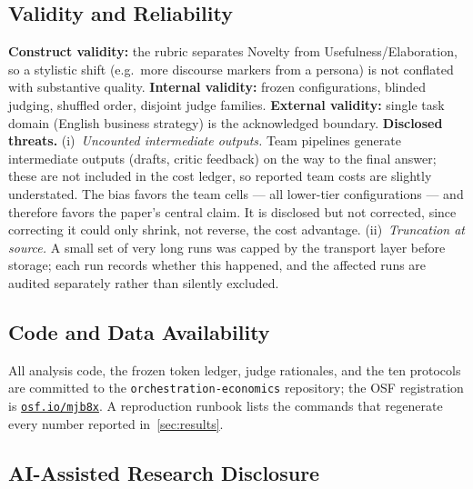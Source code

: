 \documentclass[12pt,a4paper]{article}
\begin{document}
\subsection{Validity and Reliability}

\textbf{Construct validity:} the rubric separates Novelty from
Usefulness/Elaboration, so a stylistic shift (e.g.\ more discourse markers from
a persona) is not conflated with substantive quality. \textbf{Internal validity:}
frozen configurations, blinded judging, shuffled order, disjoint judge families.
\textbf{External validity:} single task domain (English business strategy) is
the acknowledged boundary. \textbf{Disclosed threats.} (i)~\emph{Uncounted intermediate outputs.} Team
pipelines generate intermediate outputs (drafts, critic feedback) on the way to
the final answer; these are not included in the cost ledger, so reported team
costs are slightly understated. The bias favors the team cells --- all
lower-tier configurations --- and therefore favors the paper's central claim.
It is disclosed but not corrected, since correcting it could only shrink, not
reverse, the cost advantage. (ii)~\emph{Truncation at source.} A small set of
very long runs was capped by the transport layer before storage; each run
records whether this happened, and the affected runs are audited separately
rather than silently excluded.

\subsection{Code and Data Availability}

All analysis code, the frozen token ledger, judge rationales, and the ten
protocols are committed to the \texttt{orchestration-economics} repository; the
OSF registration is \href{https://osf.io/mjb8x}{\texttt{osf.io/mjb8x}}. A reproduction runbook
\citep{SandveEtAl2013} lists the commands that regenerate every number reported
in~\cref{sec:results}.

\subsection{AI-Assisted Research Disclosure}\label{sec:ai-disclosure}
\end{document}
